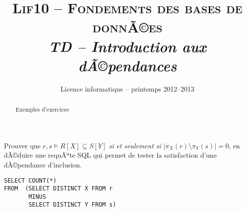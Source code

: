 \documentclass[11pt,a4paper]{article} %
\title{\textsc{Lif{10} -- Fondements des bases de donnÃ©es}\\
        \emph{TD -- Introduction aux dÃ©pendances}}
\author{Licence informatique -- printemps 2012--2013}
\date{}%
\newcommand{\di}{\subseteq}
\begin{document}
  \maketitle
  \thispagestyle{empty}


	\begin{abstract}
	Exemples d'exercices \LaTeXe
	\end{abstract} 



\begin{Exercise}[title={vÃ©rification des dÃ©pendances en SQL}, label={TD2.3}]

Prouver que $r,s \models R[X] \di S[Y]$ \emph{si et seulement si} $|\pi_X(r) \setminus \pi_{Y}(s)|=0$, en dÃ©duire  une requÃªte SQL qui permet de tester la satisfaction d'une dÃ©pendance d'inclusion.

\end{Exercise}

\begin{Answer}[ref={TD2.3}]

\begin{lstlisting}
SELECT COUNT(*)
FROM  (SELECT DISTINCT X FROM r
       MINUS
       SELECT DISTINCT Y FROM s)

\end{lstlisting}
\end{Answer}
\end{document}
